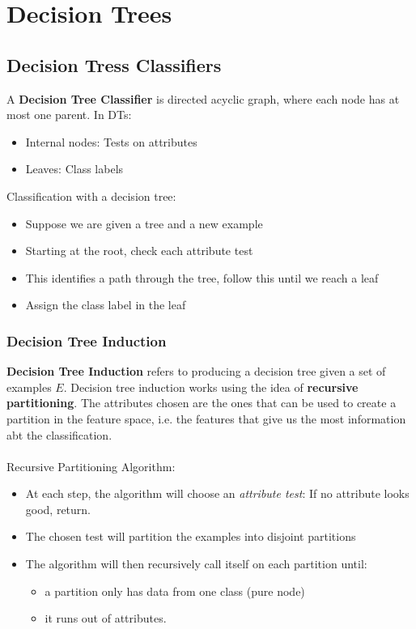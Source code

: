 \documentclass[12pt, a4paper]{book}
\begin{document}
\newpage




\chapter{Decision Trees}
\section{Decision Tress Classifiers}
A \textbf{Decision Tree Classifier} is directed acyclic graph, where each node has at most one parent. In DTs:
\begin{itemize}
    \item Internal nodes: Tests on attributes
    \item Leaves: Class labels\\
\end{itemize}
Classification with a decision tree:
\begin{itemize}
    \item Suppose we are given a tree and a new
example
    \item Starting at the root, check each attribute test
    \item This identifies a path through the tree, follow
this until we reach a leaf
    \item Assign the class label in the leaf\\
\end{itemize}

\subsection{Decision Tree Induction}
\textbf{Decision Tree Induction} refers to producing a decision tree given a set of examples $E$. Decision tree induction works using the idea of \textbf{recursive partitioning}. The attributes chosen are the ones that can be used to create a partition in the feature space, i.e. the features that give us the most information abt the classification.\\\\
Recursive Partitioning Algorithm:
\begin{itemize}
    \item At each step, the algorithm will choose an \textit{attribute test}: If no attribute looks good, return.
    \item The chosen test will partition the examples into
disjoint partitions
    \item The algorithm will then recursively call itself on each
partition until:
    \begin{itemize}
        \item a partition only has data from one class (pure node)
        \item it runs out of attributes.\\
    \end{itemize}
\end{itemize}
\end{document}
